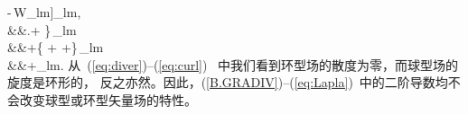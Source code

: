 -\,W_{lm}\right]\bC_{lm},
\ena
\eqa
{} \nonumber \\
&&\mbox{}\biggl.+
\biggr\}\,\bP_{lm} \nonumber \\
&&\mbox{}+\biggl\{
+
+\biggr\}\,\bB_{lm} \nonumber \\
&&\mbox{}+\bC_{lm}.
\label{eq:Lapla}
\ena
从~(\ref{eq:diver})--(\ref{eq:curl})~ 中我们看到环型场的散度为零，而球型场的旋度是环形的，
反之亦然。因此，(\ref{B.GRADIV})--(\ref{eq:Lapla})~中的二阶导数均不会改变球型或环型矢量场的特性。
